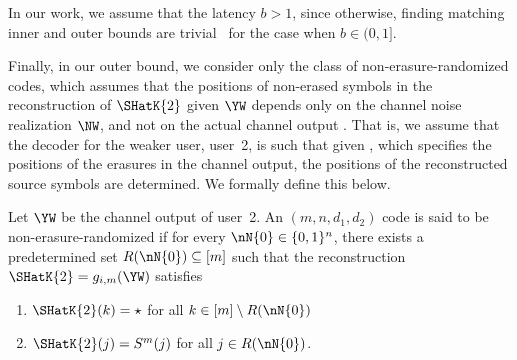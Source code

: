 \begin{remark}
	In our work, we assume that the latency $b > 1$, since otherwise, finding matching inner and outer bounds are trivial~\cite{TLKS_TIT16} for the case when $b \in (0, 1]$.
\end{remark}

Finally, in our outer bound, we consider only the class of non-erasure-randomized codes, which assumes that the positions of non-erased symbols in the reconstruction of $\SHatK{2}$ given $\YW$ depends only on the channel noise realization $\NW$, and not on the actual channel output \YW.  
That is, we assume that the decoder for the weaker user, user~2, is such that given \NW, which specifies the positions of the erasures in the channel output, the positions of the reconstructed source symbols are determined.  We formally define this below.

\begin{mydef}
\label{def:non_erasure_randomized}
	Let $\YW$ be the channel output of user~2.  An $(m, n, d_1, d_2)$ code is said to be non-erasure-randomized if for every $\nN{0} \in \{0,1\}^n$, there exists a predetermined set $R(\nN{0}) \subseteq [m]$ such that the reconstruction 
	$\SHatK{2} = g_{i, m}(\YW)$ satisfies
	
	\begin{enumerate}
		\item $\SHatK{2}(k) = \star$ for all $k \in [m] \setminus R(\nN{0})$
		\item $\SHatK{2}(j) = S^m(j)$ for all $j \in R(\nN{0})$.
	\end{enumerate}
\end{mydef}


